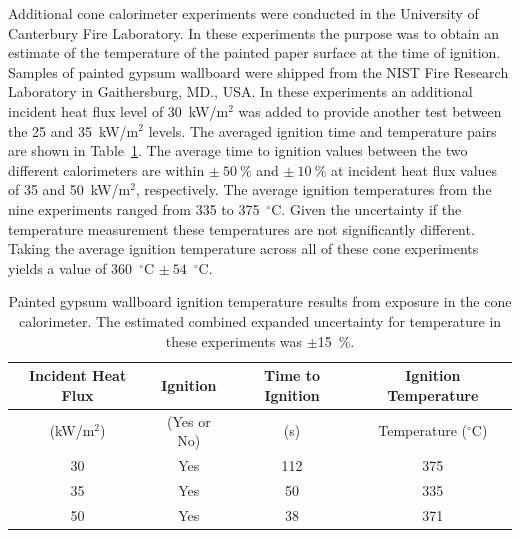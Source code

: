 \documentclass[twoside]{uocthesis}
\begin{document}
Additional cone calorimeter experiments were conducted in the University of Canterbury Fire Laboratory.  In these experiments the purpose was to obtain an estimate of the temperature of the painted paper surface at the time of ignition.   Samples of painted gypsum wallboard were shipped from the NIST Fire Research Laboratory in Gaithersburg, MD., USA.  In these experiments an additional incident heat flux level of 30~kW/m$^2$ was added to provide another test between the 25 and 35~kW/m$^2$ levels.  The averaged ignition time and temperature pairs are shown in Table~\ref{tab:Gypsum_wallboard_igntemp}.  The average time to ignition values between the two different calorimeters are within $\pm~50~\%$ and $\pm~10~\%$ at incident heat flux values of 35 and 50~kW/m$^2$, respectively.  The average ignition temperatures from the nine experiments ranged from 335 to 375~$^{\circ}$C.  Given the uncertainty if the temperature measurement these temperatures are not significantly different.  Taking the average ignition temperature across all of these cone experiments yields a value of 360~$^{\circ}$C $\pm~54$~$^{\circ}$C.  
          
\begin{table}
	\centering
	\begin{tabular}{|c|c|c|c|}
		\hline Incident Heat Flux & Ignition & Time to Ignition & Ignition Temperature \\
		\hline (kW/m$^2$) & (Yes or No) & (s)  & Temperature ($^{\circ}$C)   \\ \hline
		\hline 30 	& Yes 	& 112	& 375 	 \\
		\hline 35	& Yes 	& 50 	& 335 	 \\
		\hline 50	& Yes 	& 38 	& 371 	 \\
		\hline
	\end{tabular}
	\caption[Painted gypsum wallboard ignition temperature results]{Painted gypsum wallboard ignition temperature results from exposure in the cone calorimeter.  The estimated combined expanded uncertainty for temperature in these experiments was $\pm$15~\%.}
	\label{tab:Gypsum_wallboard_igntemp}
\end{table}
\end{document}
